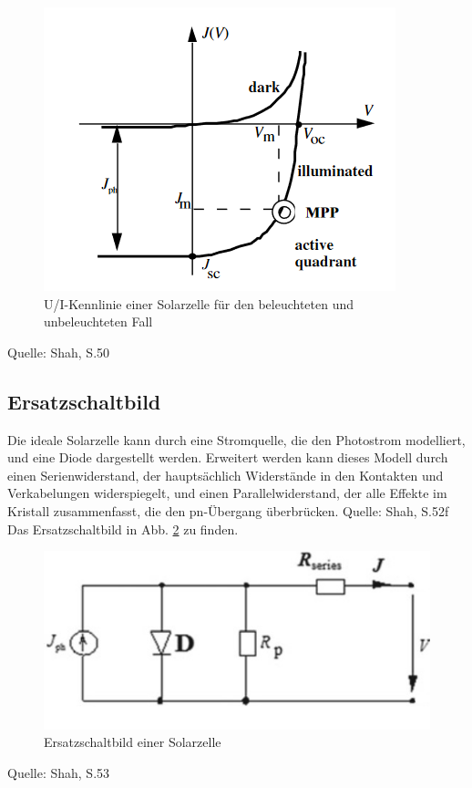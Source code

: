 \begin{figure}[h]
    \centering
    \includegraphics[scale=0.75]{Bilder/Kennlinien.png}
    \caption{U/I-Kennlinie einer Solarzelle für den beleuchteten und unbeleuchteten Fall}
    \label{bild:kennlinien}
\end{figure}

Quelle: Shah, S.50

\subsection{Ersatzschaltbild}
Die ideale Solarzelle kann durch eine Stromquelle, die den Photostrom modelliert, und eine Diode dargestellt werden. 
Erweitert werden kann dieses Modell durch einen Serienwiderstand, der hauptsächlich Widerstände in den Kontakten und Verkabelungen
widerspiegelt, und einen Parallelwiderstand, der alle Effekte im Kristall zusammenfasst, die den pn-Übergang überbrücken.
Quelle: Shah, S.52f 
Das Ersatzschaltbild in Abb. \ref{bild:ersatzschaltbild} zu finden.

\begin{figure}[h]
    \centering
    \includegraphics[scale=0.5]{Bilder/Ersatzschaltbild.png}
    \caption{Ersatzschaltbild einer Solarzelle}
    \label{bild:ersatzschaltbild}
\end{figure}
Quelle: Shah, S.53

